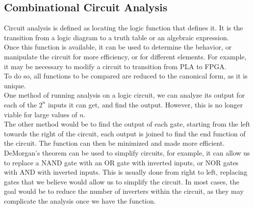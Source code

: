 \documentclass[nobib]{tufte-handout}
\begin{document}
\subsection{Combinational Circuit Analysis}
Circuit analysis is defined as locating the logic function that defines it. It
is the transition from a logic diagram to a truth table or an algebraic
expression.\\ Once this function is available, it can be used to determine the
behavior, or manipulate the circuit for more efficiency, or for different
elements. For example, it may be necessary to modify a circuit to transition
from PLA to FPGA.\\ To do so, all functions to be compared are reduced to the
canonical form, as it is unique.\\ One method of running analysis on a logic
circuit, we can analyze its output for each of the $2^n$ inputs it can get, and
find the output. However, this is no longer viable for large values of $n$.\\
The other method would be to find the output of each gate, starting from the
left towards the right of the circuit, each output is joined to find the end
function of the circuit. The function can then be minimized and made more
efficient.\\ DeMorgan's theorem can be used to simplify circuits, for example,
it can allow us to replace a NAND gate with an OR gate with inverted inputs, or
NOR gates with AND with inverted inputs. This is usually done from right to
left, replacing gates that we believe would allow us to simplify the circuit.
In most cases, the goal would be to reduce the number of inverters within the
circuit, as they may complicate the analysis once we have the function.\\
\end{document}
